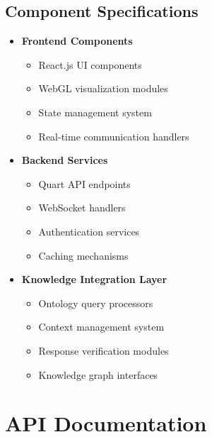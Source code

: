 \subsection{Component Specifications}
\begin{itemize}
    \item \textbf{Frontend Components}
        \begin{itemize}
            \item React.js UI components
            \item WebGL visualization modules
            \item State management system
            \item Real-time communication handlers
        \end{itemize}
    
    \item \textbf{Backend Services}
        \begin{itemize}
            \item Quart API endpoints
            \item WebSocket handlers
            \item Authentication services
            \item Caching mechanisms
        \end{itemize}
    
    \item \textbf{Knowledge Integration Layer}
        \begin{itemize}
            \item Ontology query processors
            \item Context management system
            \item Response verification modules
            \item Knowledge graph interfaces
        \end{itemize}
\end{itemize}

\section{API Documentation}
\label{sec:api-documentation}

